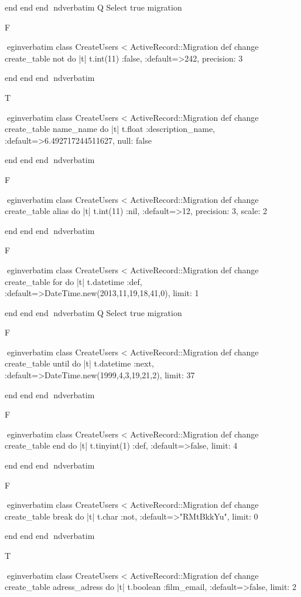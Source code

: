     end 
  end 
end
nd{verbatim}
Q
 Select true migration

F

egin{verbatim}
 class CreateUsers < ActiveRecord::Migration 
  def change 
    create_table not do |t| 
      t.int(11) :false, :default=>242, precision: 3
    
    end 
  end 
end
nd{verbatim}

T

egin{verbatim}
 class CreateUsers < ActiveRecord::Migration 
  def change 
    create_table name_name do |t| 
      t.float :description_name, :default=>6.492717244511627, null: false
    
    end 
  end 
end
nd{verbatim}

F

egin{verbatim}
 class CreateUsers < ActiveRecord::Migration 
  def change 
    create_table alias do |t| 
      t.int(11) :nil, :default=>12, precision: 3, scale: 2
    
    end 
  end 
end
nd{verbatim}

F

egin{verbatim}
 class CreateUsers < ActiveRecord::Migration 
  def change 
    create_table for do |t| 
      t.datetime :def, :default=>DateTime.new(2013,11,19,18,41,0), limit: 1
    
    end 
  end 
end
nd{verbatim}
Q
 Select true migration

F

egin{verbatim}
 class CreateUsers < ActiveRecord::Migration 
  def change 
    create_table until do |t| 
      t.datetime :next, :default=>DateTime.new(1999,4,3,19,21,2), limit: 37
    
    end 
  end 
end
nd{verbatim}

F

egin{verbatim}
 class CreateUsers < ActiveRecord::Migration 
  def change 
    create_table end do |t| 
      t.tinyint(1) :def, :default=>false, limit: 4
    
    end 
  end 
end
nd{verbatim}

F

egin{verbatim}
 class CreateUsers < ActiveRecord::Migration 
  def change 
    create_table break do |t| 
      t.char :not, :default=>"RMtBkkYu", limit: 0
    
    end 
  end 
end
nd{verbatim}

T

egin{verbatim}
 class CreateUsers < ActiveRecord::Migration 
  def change 
    create_table adress_adress do |t| 
      t.boolean :film_email, :default=>false, limit: 2
    

